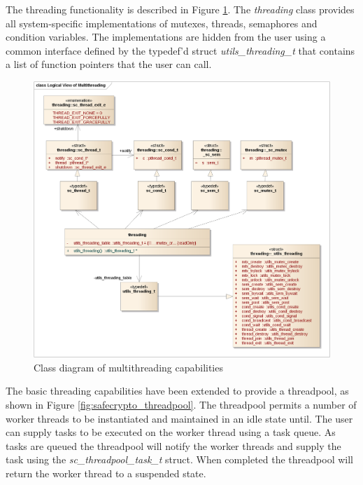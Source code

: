 The threading functionality is described in Figure \ref{fig:safecrypto_threading}. The \textit{threading} class provides all system-specific implementations of mutexes, threads, semaphores and condition variables. The implementations are hidden from the user using a common interface defined by the typedef'd struct \textit{utils\_threading\_t} that contains a list of function pointers that the user can call.

\begin{figure}[!h]
\centering
\includegraphics[width=\textwidth]{libsafecrypto_multithreading_logical_view.png}
\caption{Class diagram of multithreading capabilities}
\label{fig:safecrypto_threading}
\end{figure}

\newpage
The basic threading capabilities have been extended to provide a threadpool, as shown in Figure \ref{fig:safecrypto_threadpool}. The threadpool permits a number of worker threads to be instantiated and maintained in an idle state until. The user can supply tasks to be executed on the worker thread using a task queue. As tasks are queued the threadpool will notify the worker threads and supply the task using the \textit{sc\_threadpool\_task\_t} struct. When completed the threadpool will return the worker thread to a suspended state.

